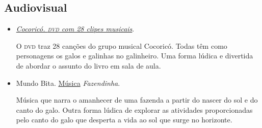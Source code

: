 \documentclass[11pt]{extarticle}
\begin{document}
\subsection{Audiovisual}

\begin{itemize}
\item \href{https://www.youtube.com/watch?v=EznwhYEC9tE}{\textit{Cocoricó. \textsc{dvd} com 28 clipes musicais}}.  

O \textsc{dvd} traz 28 canções do grupo musical Cocoricó. Todas têm como personagens os galos e galinhas no galinheiro. Uma forma lúdica e divertida de abordar o assunto do livro em sala de aula.

\item Mundo Bita. \href{https://www.youtube.com/watch?v=cjONzZPJONc}{Música} \textit{Fazendinha}. 

Música que narra o amanhecer de uma fazenda a partir do nascer do sol e do canto do galo. Outra forma lúdica de explorar as atividades proporcionadas pelo canto do galo que desperta a vida ao sol que surge no horizonte.
\end{itemize}
\end{document}
